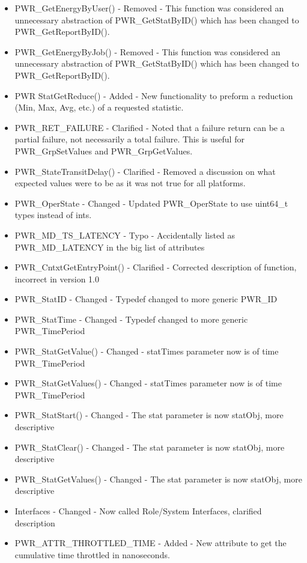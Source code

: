 \begin{itemize}
    \item{PWR_GetEnergyByUser() - Removed - This function was considered an unnecessary abstraction of PWR_GetStatByID() which has been changed to PWR_GetReportByID().}
    \item{PWR_GetEnergyByJob() - Removed - This function was considered an unnecessary abstraction of PWR_GetStatByID() which has been changed to PWR_GetReportByID().}
    \item{PWR StatGetReduce() - Added - New functionality to preform a reduction (Min, Max, Avg, etc.) of a requested statistic. }
    \item{PWR_RET_FAILURE - Clarified - Noted that a failure return can be a partial failure, not necessarily a total failure. This is useful for PWR_GrpSetValues and PWR_GrpGetValues.}
    \item{PWR_StateTransitDelay() - Clarified - Removed a discussion on what expected values were to be as it was not true for all platforms.}
    \item{PWR_OperState - Changed - Updated PWR_OperState to use uint64_t types instead of ints.}
    \item{PWR_MD_TS_LATENCY - Typo - Accidentally listed as PWR_MD_LATENCY in the big list of attributes}
    \item{PWR_CntxtGetEntryPoint() - Clarified - Corrected description of function, incorrect in version 1.0}
    \item{PWR_StatID - Changed - Typedef changed to more generic PWR_ID}
    \item{PWR_StatTime - Changed - Typedef changed to more generic PWR_TimePeriod}
    \item{PWR_StatGetValue() - Changed - statTimes parameter now is of time PWR_TimePeriod}
    \item{PWR_StatGetValues() - Changed - statTimes parameter now is of time PWR_TimePeriod}
    \item{PWR_StatStart() - Changed - The stat parameter is now statObj, more descriptive}
    \item{PWR_StatClear() - Changed - The stat parameter is now statObj, more descriptive}
    \item{PWR_StatGetValues() - Changed  - The stat parameter is now statObj, more descriptive}
    \item{Interfaces - Changed - Now called Role/System Interfaces, clarified description}
    \item{PWR_ATTR_THROTTLED_TIME - Added - New attribute to get the cumulative time throttled in nanoseconds.}

\end{itemize}

